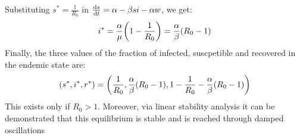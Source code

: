 \documentclass[../main/main.tex]{subfiles}
\begin{document}
Substituting \( s^* = \frac{1}{R_0} \) in \( \dv{s}{t} = \alpha - \beta s i - \alpha w  \), we get:
\begin{equation*}
  i^* = \frac{\alpha }{\mu } \qty(1 - \frac{1}{R_0}) = \frac{\alpha }{\beta } (R_0 -1)
\end{equation*}
Finally, the three values of the fraction of infected, suscpetible and recovered in the endemic state are:
\begin{equation}
  (s^*, i^*, r^*) = \qty( \frac{1}{R_0}, \frac{\alpha }{\beta } (R_0 -1 ), 1- \frac{1}{R_0} - \frac{\alpha }{\beta } (R_0-1))
\end{equation}
This exists only if \( R_0>1 \). Moreover, via linear stability analysis it can be demonstrated that this equilibrium is stable and is reached through damped oscillations
\end{document}

